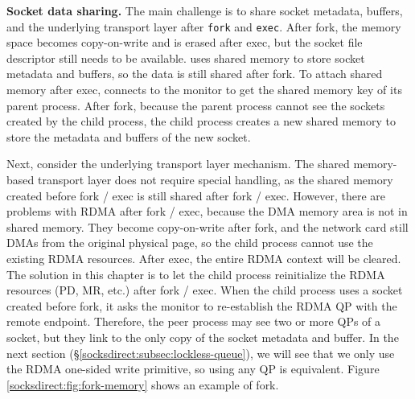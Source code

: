 \textbf {Socket data sharing.}
The main challenge is to share socket metadata, buffers, and the underlying transport layer after \texttt {fork} and \texttt {exec}. After fork, the memory space becomes copy-on-write and is erased after exec, but the socket file descriptor still needs to be available. \sys{} uses shared memory to store socket metadata and buffers, so the data is still shared after fork. To attach shared memory after exec, \libipc {} connects to the monitor to get the shared memory key of its parent process. After fork, because the parent process cannot see the sockets created by the child process, the child process creates a new shared memory to store the metadata and buffers of the new socket.

Next, consider the underlying transport layer mechanism. The shared memory-based transport layer does not require special handling, as the shared memory created before fork / exec is still shared after fork / exec. However, there are problems with RDMA after fork / exec, because the DMA memory area is not in shared memory. They become copy-on-write after fork, and the network card still DMAs from the original physical page, so the child process cannot use the existing RDMA resources. After exec, the entire RDMA context will be cleared. The solution in this chapter is to let the child process reinitialize the RDMA resources (PD, MR, etc.) after fork / exec. When the child process uses a socket created before fork, it asks the monitor to re-establish the RDMA QP with the remote endpoint. Therefore, the peer process may see two or more QPs of a socket, but they link to the only copy of the socket metadata and buffer. In the next section (\S\ref{socksdirect:subsec:lockless-queue}), we will see that we only use the RDMA one-sided write primitive, so using any QP is equivalent. Figure \ref {socksdirect:fig:fork-memory} shows an example of fork.

